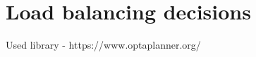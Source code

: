 
\section{Load balancing decisions}\label{sec:load-balancing-decisions}

Used library - https://www.optaplanner.org/
